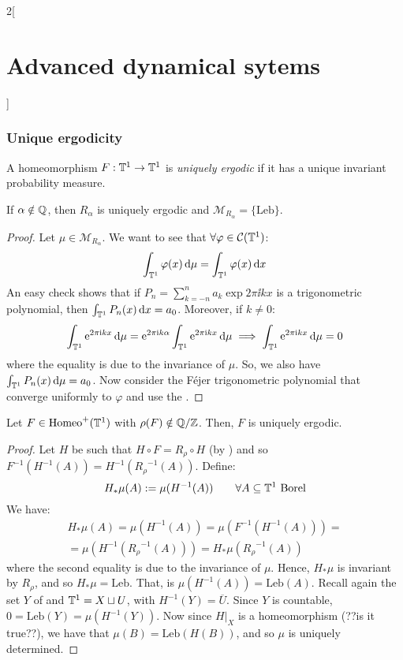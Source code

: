 \documentclass[../../../main_math.tex]{subfiles}
\begin{document}
\begin{multicols}{2}[\section{Advanced dynamical sytems}]
  \subsubsection{Unique ergodicity}
  \begin{definition}
    A homeomorphism $F:\mathbb{T}^1\to\mathbb{T}^1$ is \emph{uniquely ergodic} if it has a unique invariant probability measure.
  \end{definition}
  \begin{lemma}
    If $\alpha\notin \mathbb{Q}$, then $R_\alpha$ is uniquely ergodic and $\mathcal{M}_{R_\alpha}=\{\text{Leb}\}$.
  \end{lemma}
  \begin{proof}
    Let $\mu\in\mathcal{M}_{R_\alpha}$. We want to see that $\forall \varphi\in \mathcal{C}(\mathbb{T}^1)$:
    $$
      \int_{\mathbb{T}^1}\varphi(x)\dd{\mu}=\int_{\mathbb{T}^1}\varphi(x)\dd{x}
    $$
    An easy check shows that if $P_n=\sum_{k=-n}^na_k\exp{2\pi\ii k x}$ is a trigonometric polynomial, then $\int_{\mathbb{T}^1}P_n(x)\dd{x}=a_0$. Moreover, if $k\ne 0$:
    $$
      \int_{\mathbb{T}^1}\mathrm{e}^{2\pi\mathrm{i} kx}\dd{\mu}=\mathrm{e}^{2\pi\mathrm{i} k\alpha}\int_{\mathbb{T}^1}\mathrm{e}^{2\pi\mathrm{i} kx}\dd{\mu}\implies \int_{\mathbb{T}^1}\mathrm{e}^{2\pi\mathrm{i} kx}\dd{\mu}=0
    $$
    where the equality is due to the invariance of $\mu$. So, we also have $\int_{\mathbb{T}^1}P_n(x)\dd{\mu}=a_0$. Now consider the Féjer trigonometric polynomial that converge uniformly to $\varphi$ and use the .
  \end{proof}
  \begin{proposition}
    Let $F\in\mathrm{Homeo}^+(\mathbb{T}^1)$ with $\rho(F)\notin\quot{\QQ}{\ZZ}$. Then, $F$ is uniquely ergodic.
  \end{proposition}
  \begin{proof}
    Let $H$ be such that $H\circ F=R_\rho\circ H$ (by ) and so $F^{-1}(H^{-1}(A))=H^{-1}({R_\rho}^{-1}(A))$. Define:
    $$
      H_*\mu(A):=\mu(H^{-1}(A))\qquad \forall A\subseteq \mathbb{T}^1\text{ Borel}
    $$
    We have:
    \begin{multline*}
      H_*\mu(A)=\mu(H^{-1}(A))=\mu(F^{-1}(H^{-1}(A)))=\\=\mu(H^{-1}({R_\rho}^{-1}(A)))=H_*\mu({R_\rho}^{-1}(A))
    \end{multline*}
    where the second equality is due to the invariance of $\mu$. Hence, $H_*\mu$ is invariant by $R_\rho$, and so $H_*\mu=\text{Leb}$. That, is $\mu(H^{-1}(A))=\text{Leb}(A)$. Recall again the set $Y$ of  and $\mathbb{T}^1=X\sqcup U$, with $H^{-1}(Y)=\overline{U}$. Since $Y$ is countable, $0=\text{Leb}(Y)=\mu(H^{-1}(Y))$. Now since $H|_X$ is a homeomorphism (??is it true??), we have that $\mu(B)=\text{Leb}(H(B))$, and so $\mu$ is uniquely determined.

\end{proof}
\end{multicols}
\end{document}
